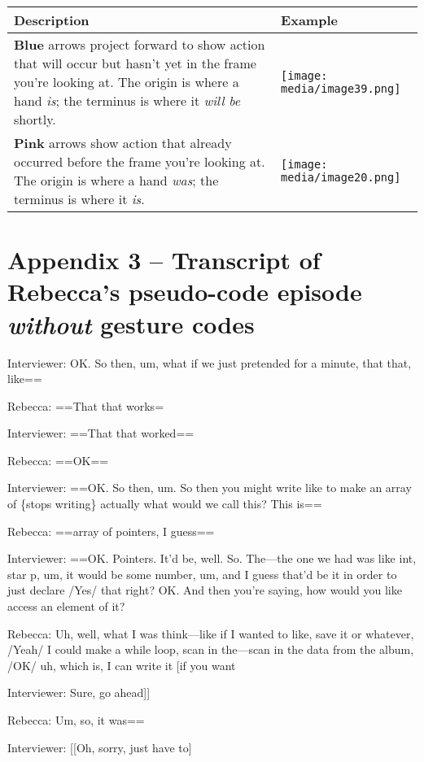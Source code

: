 \begin{longtable}[]{@{}ll@{}}
\toprule
\textbf{Description} & \textbf{Example}\tabularnewline
\midrule
\endhead
\textbf{Blue} arrows project forward to show action that will occur but
hasn't yet in the frame you're looking at. The origin is where a hand
\emph{is}; the terminus is where it \emph{will be} shortly. &
\texttt{[image: media/image39.png]}\tabularnewline
\textbf{Pink} arrows show action that already occurred before the frame
you're looking at. The origin is where a hand \emph{was}; the terminus
is where it \emph{is}. &
\texttt{[image: media/image20.png]}\tabularnewline
\bottomrule
\end{longtable}

\section{\texorpdfstring{Appendix 3 -- Transcript of Rebecca's
pseudo-code episode \emph{without} gesture
codes}{Appendix 3 -- Transcript of Rebecca's pseudo-code episode without gesture codes}}\label{appendix-3-transcript-of-rebeccas-pseudo-code-episode-without-gesture-codes}

Interviewer: OK. So then, um, what if we just pretended for a minute,
that that, like==

Rebecca: ==That that works=

Interviewer: ==That that worked==

Rebecca: ==OK==

Interviewer: ==OK. So then, um. So then you might write like to make an
array of \{stops writing\} actually what would we call this? This is==

Rebecca: ==array of pointers, I guess==

Interviewer: ==OK. Pointers. It'd be, well. So. The---the one we had was
like int, star p, um, it would be some number, um, and I guess that'd be
it in order to just declare /Yes/ that right? OK. And then you're
saying, how would you like access an element of it?

Rebecca: Uh, well, what I was think---like if I wanted to like, save it
or whatever, /Yeah/ I could make a while loop, scan in the---scan in the
data from the album, /OK/ uh, which is, I can write it {[}if you want

Interviewer: Sure, go ahead{]}{]}

Rebecca: Um, so, it was==

Interviewer: {[}{[}Oh, sorry, just have to{]}

